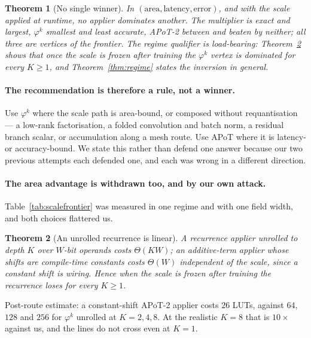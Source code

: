 \documentclass[11pt]{article}
\newtheorem{theorem}{Theorem}
\theoremstyle{definition}
\begin{document}
\begin{theorem}[No single winner]
\label{thm:threevertex}
In $(\text{area}, \text{latency}, \text{error})$, and with the scale applied at
runtime, no applier dominates another. The multiplier is exact and largest,
$\varphi^{k}$ smallest and least accurate, APoT-2 between and beaten by neither;
all three are vertices of the frontier. The regime qualifier is load-bearing:
Theorem~\ref{thm:unrolled} shows that once the scale is frozen after training the
$\varphi^{k}$ vertex is dominated for every $K \geq 1$, and
Theorem~\ref{thm:regime} states the inversion in general.
\end{theorem}

\paragraph{The recommendation is therefore a rule, not a winner.} Use
$\varphi^{k}$ where the scale path is area-bound, or composed without
requantisation --- a low-rank factorisation, a folded convolution and batch norm,
a residual branch scalar, or accumulation along a mesh route. Use APoT where it is
latency- or accuracy-bound. We state this rather than defend one answer because
our two previous attempts each defended one, and each was wrong in a different
direction.



\paragraph{The area advantage is withdrawn too, and by our own attack.}
Table~\ref{tab:scalefrontier} was measured in one regime and with one field
width, and both choices flattered us.

\begin{theorem}[An unrolled recurrence is linear]
\label{thm:unrolled}
A recurrence applier unrolled to depth $K$ over $W$-bit operands costs
$\Theta(KW)$; an additive-term applier whose shifts are compile-time constants
costs $\Theta(W)$ independent of the scale, since a constant shift is wiring.
Hence when the scale is frozen after training the recurrence loses for every
$K \ge 1$.
\end{theorem}

Post-route estimate: a constant-shift APoT-2 applier costs $26$ LUTs, against $64$, $128$
and $256$ for $\varphi^{k}$ unrolled at $K=2,4,8$. At the realistic $K=8$ that is
$10\times$ against us, and the lines do not cross even at $K=1$.
\end{document}
